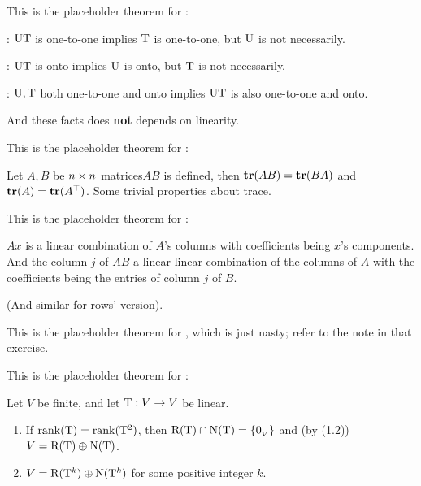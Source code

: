 \begin{additional theorem} \label{athm 2.26}
This is the placeholder theorem for :

: \(\mathrm{U}\mathrm{T}\) is one-to-one implies \(\mathrm{T}\) is one-to-one, but \(\mathrm{U}\) is not necessarily.

: \(\mathrm{U}\mathrm{T}\) is onto implies \(\mathrm{U}\) is onto, but \(\mathrm{T}\) is not necessarily.

: \(\mathrm{U}, \mathrm{T}\) both one-to-one and onto implies \(\mathrm{U}\mathrm{T}\) is also one-to-one and onto.

And these facts does \textbf{not} depends on linearity.
\end{additional theorem}

\begin{additional theorem} \label{athm 2.27}
This is the placeholder theorem for :

Let \(A, B\) be \(n \times n\) matrices\(AB\) is defined, then \(\textbf{tr}(AB) = \textbf{tr}(BA)\) and \(\textbf{tr}(A) = \textbf{tr}(A^\top)\).
Some trivial properties about trace.
\end{additional theorem}

\begin{additional theorem} \label{athm 2.28}
This is the placeholder theorem for :

\(Ax\) is a linear combination of \(A\)'s columns with coefficients being \(x\)'s components.
And the column \(j\) of \(AB\) a linear linear combination of the columns of \(A\) with the coefficients being the entries of column \(j\) of \(B\).

(And similar for rows' version).
\end{additional theorem}

\begin{additional theorem} \label{athm 2.29}
This is the placeholder theorem for , which is just nasty;
refer to the note in that exercise.
\end{additional theorem}

\begin{additional theorem} \label{athm 2.30}
This is the placeholder theorem for :

Let \(V\) be finite, and let \(\mathrm{T} : V \to V\) be linear.
\begin{enumerate}
\item If \(\mathrm{rank}(\mathrm{T}) = \mathrm{rank}(\mathrm{T}^2)\), then \(\mathrm{R(T)} \cap \mathrm{N(T)} = \{ 0_{_V} \}\) and (by (1.2)) \(V = \mathrm{R(T)} \oplus \mathrm{N(T)}\).
\item \(V = \mathrm{R}(\mathrm{T}^k) \oplus \mathrm{N}(\mathrm{T}^k)\) for some positive integer \(k\).
\end{enumerate}
\end{additional theorem}

